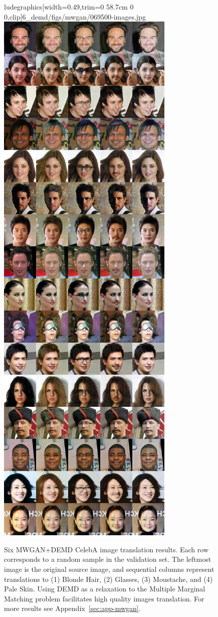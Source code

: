 \begin{figure}[t]
ludegraphics[width=0.49\linewidth,trim={0 58.7cm 0 0},clip]{6_demd/figs/mwgan/069500-images.jpg} \includegraphics[width=0.49\linewidth,trim={0 0 0 58.7cm},clip]{6_demd/figs/mwgan/069500-images.jpg}
    \caption[Image translation on CelebA via d-MMOT]{Six MWGAN+DEMD CelebA image translation results. Each row corresponds to a random sample in the validation set. The leftmost image is the original source image, and sequential columns represent translations to (1) Blonde Hair, (2) Glasses, (3) Moustache, and (4) Pale Skin. Using DEMD as a relaxation to the Multiple Marginal Matching problem facilitates high quality images translation. For more results see Appendix~\ref{sec:app-mwgan}. }
    \label{fig:mwgan}
\end{figure}





